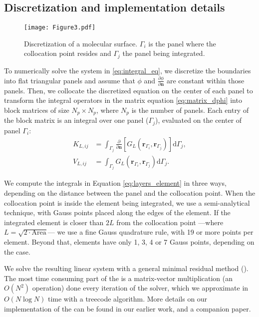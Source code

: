 

\subsection{Discretization and implementation details}

 \begin{figure}[b]
   \centering
   \texttt{[image: Figure3.pdf]} 
   \caption{Discretization of a molecular surface. $\Gamma_i$ is the panel where the collocation point resides and $\Gamma_j$ the panel being integrated.}
   \label{fig:molecule_disc}
\end{figure}

To numerically solve the system in \eqref{eq:integral_eq}, we discretize the boundaries into flat triangular panels and assume that $\phi$ and $\frac{\partial \phi}{\partial \mathbf{n}}$ are constant within those panels. Then, we collocate the discretized equation on the center of each panel to transform the integral operators in the matrix equation \eqref{eq:matrix_dphi} into block matrices of size $N_p \times N_p$, where $N_p$ is the number of panels. Each entry of the block matrix is an integral over one panel ($\Gamma_j$), evaluated on the center of panel $\Gamma_i$:
%
\begin{align} \label{eq:layers_element}
K_{L,ij} &= \int_{\Gamma_j} \frac{\partial}{\partial \mathbf{n}} \left[ G_L(\mathbf{r}_{\Gamma_i},\mathbf{r}_{\Gamma_j}) \right]\mathrm{d} \Gamma_j, \nonumber \\
V_{L,ij} &= \int_{\Gamma_j} G_L(\mathbf{r}_{\Gamma_i},\mathbf{r}_{\Gamma_j})  \mathrm{d} \Gamma_j.
\end{align}

We compute the integrals in Equation \eqref{eq:layers_element} in three ways, depending on the distance between the panel and the collocation point. When the collocation point is inside the element being integrated, we use a semi-analytical technique, \cite{ZhuHuangSongWhite2001} with Gauss points placed along the edges of the element. If the integrated element is closer than $2L$ from the collocation point ---where $L = \sqrt{2\cdot \text{Area}}$--- we use a fine Gauss quadrature rule, with 19 or more points per element. Beyond that,  elements have only 1, 3, 4 or 7 Gauss points, depending on the case.

We solve the resulting linear system with a general minimal residual method (\gmres). The most time consuming part of the \gmres is a matrix-vector multiplication (an $O(N^2)$ operation) done every iteration of the solver, which we approximate in $O(N\log N)$ time with a treecode algorithm\cite{BarnesHut1986}. More details on our implementation of the \bem can be found in our earlier work,\cite{CooperBarba-share154331} and a companion paper.\cite{CooperBarba2015a}
